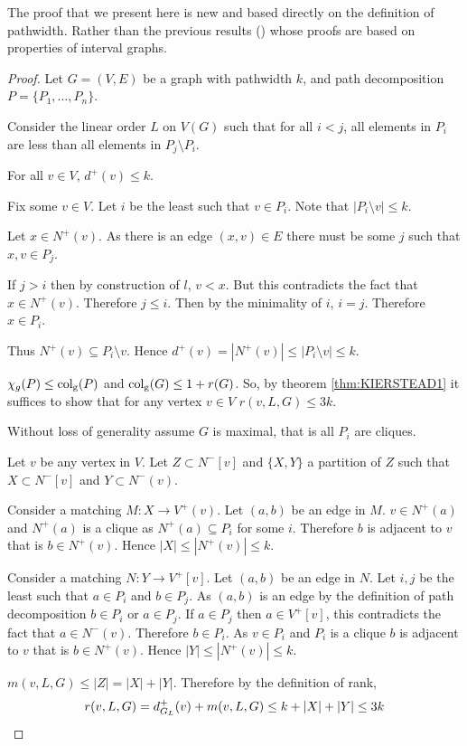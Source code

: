 The proof that we present here is new and based directly on the definition of pathwidth. Rather than the previous results (\cite{faKeKiTr1993,KIERSTEAD2000}) whose proofs are based on properties of interval graphs. 

\begin{proof}
    Let $G=(V,E)$ be a graph with pathwidth $k$, and path decomposition $P=\{P_1,\dots,P_n\}$. 

    Consider the linear order $L$ on $V(G)$ such that for all $i<j$, all elements in $P_i$ are less than all elements in $P_j \setminus P_i$.  
        
    
    \begin{claim}
        For all $v\in V$, $d^+(v) \leq k$. 
    \end{claim}
    \begin{claimproof}
        Fix some $v\in V$. Let $i$ be the least such that $v\in P_i$. Note that $|P_i\setminus v|\leq k$. 
        
        Let $x\in N^+(v)$. As there is an edge $(x,v)\in E$ there must be some $j$ such that $x,v\in P_j$. 
        
        If $j>i$ then by construction of $l$, $v<x$. But this contradicts the fact that $x\in N^+(v)$. Therefore $j\leq i$. Then by the minimality of $i$, $i=j$. Therefore $x\in P_i$. 
        
        Thus $N^+(v)\subseteq P_i\setminus v$. Hence $d^+(v)=  |N^+(v)|\leq |P_i\setminus v| \leq k$.  
    \end{claimproof}
    
    $\chi_g(P) \leq{\operatorname{col_g}}(P)$ and $\operatorname{col_g}(G)\leq 1+r(G)$. So, by theorem \ref{thm:KIERSTEAD1} it suffices to show that for any vertex $v \in V$ $r(v,L,G) \leq 3k$. 
    
    Without loss of generality assume $G$ is maximal, that is all $P_i$ are cliques. 
    
    Let $v$ be any vertex in $V$. Let $Z \subset N^-[v]$ and $\{X,Y\}$ a partition of $Z$ such that $X\subset N^-[v]$ and  $Y\subset N^-(v)$. 
    
    Consider a matching $M\colon X \to V^+(v)$. Let $(a,b)$ be an edge in $M$. $v\in N^+(a)$ and $N^+(a)$ is a clique as $N^+(a) \subseteq P_i$ for some $i$. Therefore $b$ is adjacent to $v$ that is $b\in N^+(v)$. Hence $|X|\leq|N^+(v)|\leq k$. 
    
    Consider a matching $N\colon Y \to V^+[v]$. Let $(a,b)$ be an edge in $N$. %
    Let $i,j$ be the least such that $a\in P_i$ and $b\in P_j$. As $(a,b)$ is an edge by the definition of path decomposition $b\in P_i$ or $a\in P_j$. If $a \in P_j$ then $a \in V^+[v]$, this contradicts the fact that $a\in N^-(v)$. Therefore $b\in P_i$. As $v\in P_i$ and $P_i$ is a clique $b$ is adjacent to $v$ that is $b\in N^+(v)$. Hence $|Y|\leq|N^+(v)|\leq k$.  
    
    $m(v,L,G) \leq |Z| = |X|+|Y|$. Therefore by the definition of rank, \[r(v,L,G) = d^+_{G_L}(v) + m(v,L,G) \leq k + |X|+|Y| \leq 3k\qedhere\]
\end{proof}

